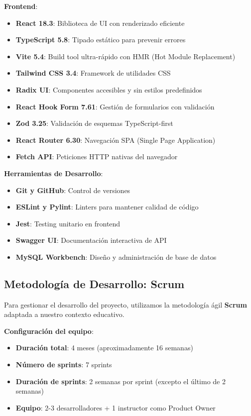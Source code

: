 \textbf{Frontend}:
\begin{itemize}
    \item \textbf{React 18.3}: Biblioteca de UI con renderizado eficiente
    \item \textbf{TypeScript 5.8}: Tipado estático para prevenir errores
    \item \textbf{Vite 5.4}: Build tool ultra-rápido con HMR (Hot Module Replacement)
    \item \textbf{Tailwind CSS 3.4}: Framework de utilidades CSS
    \item \textbf{Radix UI}: Componentes accesibles y sin estilos predefinidos
    \item \textbf{React Hook Form 7.61}: Gestión de formularios con validación
    \item \textbf{Zod 3.25}: Validación de esquemas TypeScript-first
    \item \textbf{React Router 6.30}: Navegación SPA (Single Page Application)
    \item \textbf{Fetch API}: Peticiones HTTP nativas del navegador
\end{itemize}

\textbf{Herramientas de Desarrollo}:
\begin{itemize}
    \item \textbf{Git y GitHub}: Control de versiones
    \item \textbf{ESLint y Pylint}: Linters para mantener calidad de código
    \item \textbf{Jest}: Testing unitario en frontend
    \item \textbf{Swagger UI}: Documentación interactiva de API
    \item \textbf{MySQL Workbench}: Diseño y administración de base de datos
\end{itemize}

\subsection{Metodología de Desarrollo: Scrum}

Para gestionar el desarrollo del proyecto, utilizamos la metodología ágil \textbf{Scrum} adaptada a nuestro contexto educativo.

\textbf{Configuración del equipo}:
\begin{itemize}
    \item \textbf{Duración total}: 4 meses (aproximadamente 16 semanas)
    \item \textbf{Número de sprints}: 7 sprints
    \item \textbf{Duración de sprints}: 2 semanas por sprint (excepto el último de 2 semanas)
    \item \textbf{Equipo}: 2-3 desarrolladores + 1 instructor como Product Owner
\end{itemize}

